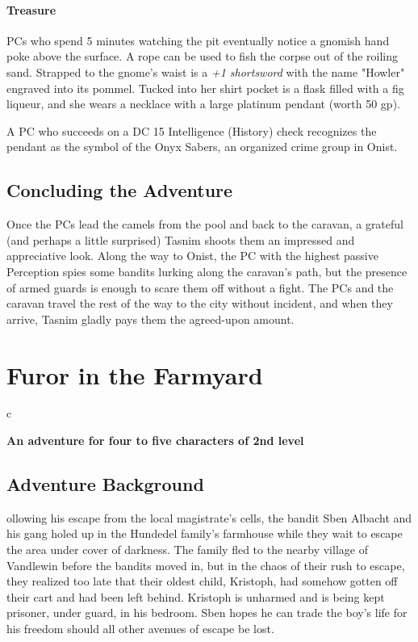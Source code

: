 \documentclass[10pt,a4paper,twoside,bg=print,twocolumn,openany,nodeprecatedcode]{dndbook}
\begin{document}
\subsubsection{Treasure}
PCs who spend 5 minutes watching the pit eventually notice a gnomish hand poke above the surface. A rope can be used to fish the corpse out of the roiling sand. Strapped to the gnome's waist is a \textit{+1 shortsword} with the name "Howler" engraved into its pommel. Tucked into her shirt pocket is a flask filled with a fig liqueur, and she wears a necklace with a large platinum pendant (worth 50 gp).

A PC who succeeds on a DC 15 Intelligence (History) check recognizes the pendant as the symbol of the Onyx Sabers, an organized crime group in Onist.

\section{Concluding the Adventure}
Once the PCs lead the camels from the pool and back to the caravan, a grateful (and perhaps a little surprised) Tasnim shoots them an impressed and appreciative look. Along the way to Onist, the PC with the highest passive Perception spies some bandits lurking along the caravan's path, but the presence of armed guards is enough to scare them off without a fight. The PCs and the caravan travel the rest of the way to the city without incident, and when they arrive, Tasnim gladly pays them the agreed-upon amount.

\chapter{Furor in the Farmyard}

\begin{DndTable}{c}

\textbf{An adventure for four to five characters of 2nd level}\\
\end{DndTable}

\section{Adventure Background}
ollowing his escape from the local magistrate's cells, the bandit Sben Albacht and his gang holed up in the Hundedel family's farmhouse while they wait to escape the area under cover of darkness. The family fled to the nearby village of Vandlewin before the bandits moved in, but in the chaos of their rush to escape, they realized too late that their oldest child, Kristoph, had somehow gotten off their cart and had been left behind. Kristoph is unharmed and is being kept prisoner, under guard, in his bedroom. Sben hopes he can trade the boy's life for his freedom should all other avenues of escape be lost.
\end{document}
